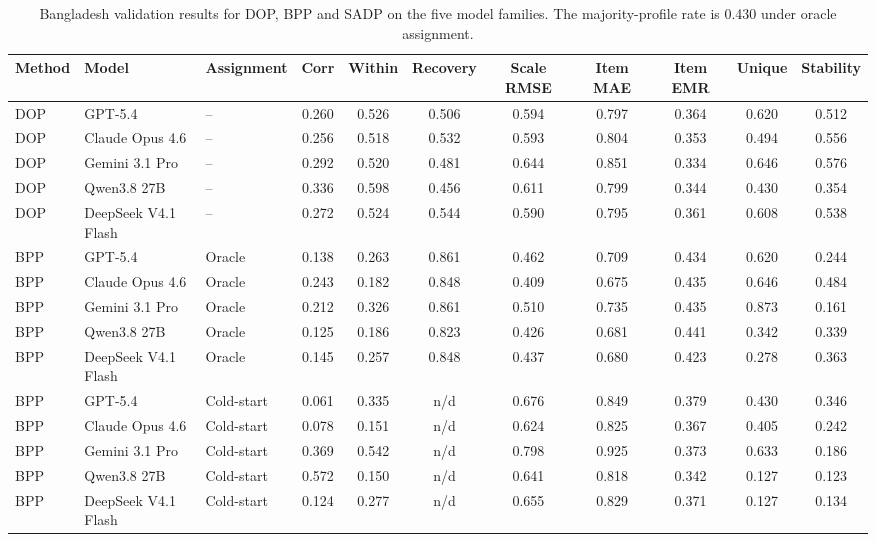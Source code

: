 \begin{table}[pos=!htbp]
\scriptsize\centering\setlength{\tabcolsep}{2.5pt}
\caption{Bangladesh validation results for DOP, BPP and SADP on the five model families. The majority-profile rate is 0.430 under oracle assignment.}
\label{tab:grid-bd-val}
\begin{tabular*}{\textwidth}{@{\extracolsep{\fill}}lllcccccccc@{}}
\toprule
Method & Model & Assignment & Corr & Within & Recovery & Scale RMSE & Item MAE & Item EMR & Unique & Stability \\
\midrule
DOP & GPT-5.4 & -- & 0.260 & 0.526 & 0.506 & 0.594 & 0.797 & 0.364 & 0.620 & 0.512 \\
DOP & Claude Opus 4.6 & -- & 0.256 & 0.518 & 0.532 & 0.593 & 0.804 & 0.353 & 0.494 & 0.556 \\
DOP & Gemini 3.1 Pro & -- & 0.292 & 0.520 & 0.481 & 0.644 & 0.851 & 0.334 & 0.646 & 0.576 \\
DOP & Qwen3.8 27B & -- & 0.336 & 0.598 & 0.456 & 0.611 & 0.799 & 0.344 & 0.430 & 0.354 \\
DOP & DeepSeek V4.1 Flash & -- & 0.272 & 0.524 & 0.544 & 0.590 & 0.795 & 0.361 & 0.608 & 0.538 \\
\addlinespace[2pt]
BPP & GPT-5.4 & Oracle & 0.138 & 0.263 & 0.861 & 0.462 & 0.709 & 0.434 & 0.620 & 0.244 \\
BPP & Claude Opus 4.6 & Oracle & 0.243 & 0.182 & 0.848 & 0.409 & 0.675 & 0.435 & 0.646 & 0.484 \\
BPP & Gemini 3.1 Pro & Oracle & 0.212 & 0.326 & 0.861 & 0.510 & 0.735 & 0.435 & 0.873 & 0.161 \\
BPP & Qwen3.8 27B & Oracle & 0.125 & 0.186 & 0.823 & 0.426 & 0.681 & 0.441 & 0.342 & 0.339 \\
BPP & DeepSeek V4.1 Flash & Oracle & 0.145 & 0.257 & 0.848 & 0.437 & 0.680 & 0.423 & 0.278 & 0.363 \\
BPP & GPT-5.4 & Cold-start & 0.061 & 0.335 & n/d & 0.676 & 0.849 & 0.379 & 0.430 & 0.346 \\
BPP & Claude Opus 4.6 & Cold-start & 0.078 & 0.151 & n/d & 0.624 & 0.825 & 0.367 & 0.405 & 0.242 \\
BPP & Gemini 3.1 Pro & Cold-start & 0.369 & 0.542 & n/d & 0.798 & 0.925 & 0.373 & 0.633 & 0.186 \\
BPP & Qwen3.8 27B & Cold-start & 0.572 & 0.150 & n/d & 0.641 & 0.818 & 0.342 & 0.127 & 0.123 \\
BPP & DeepSeek V4.1 Flash & Cold-start & 0.124 & 0.277 & n/d & 0.655 & 0.829 & 0.371 & 0.127 & 0.134 \\

\end{tabular*}
\end{table}
